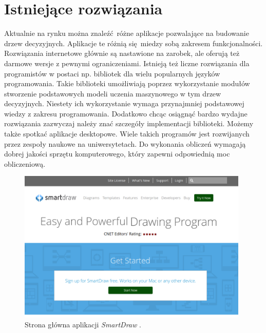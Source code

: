 \section{Istniejące rozwiązania}
Aktualnie na rynku można znaleźć różne aplikacje pozwalające na budowanie drzew decyzyjnych. Aplikacje te różnią się miedzy sobą zakresem funkcjonalności. Rozwiązania internetowe głównie są nastawione na zarobek, ale oferują też darmowe wersje z pewnymi ograniczeniami. Istnieją też liczne rozwiązania dla programistów w postaci np. bibliotek dla wielu popularnych języków programowania. Takie biblioteki umożliwiają poprzez wykorzystanie modułów stworzenie podstawowych modeli uczenia maszynowego w tym drzew decyzyjnych. Niestety ich wykorzystanie wymaga przynajmniej podstawowej wiedzy z zakresu programowania. Dodatkowo chcąc osiągnąć bardzo wydajne rozwiązania zazwyczaj należy znać szczegóły implementacji biblioteki. Możemy także spotkać aplikacje desktopowe. Wiele takich programów jest rozwijanych przez zespoły naukowe na uniwersytetach. Do wykonania obliczeń wymagają dobrej jakości sprzętu komputerowego, który zapewni odpowiednią moc obliczeniową. 

\begin{figure}[htb]
	\centering
	\includegraphics[width=11cm]{grafika/smartdraw.eps}
	\caption{Strona główna aplikacji \textit{SmartDraw} \cite{misc_smartdraw}.}
	\label{rys21_smartdraw}
\end{figure}

